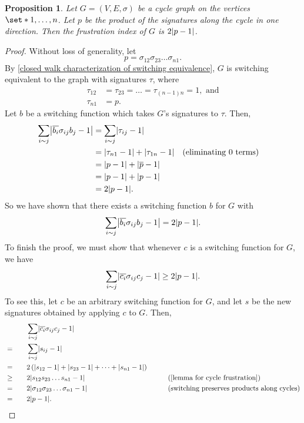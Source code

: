 \documentclass[12pt]{article}
\newtheorem{prop}[thm]{Proposition}
\theoremstyle{definition}
\DeclarePairedDelimiter\abs{\lvert}{\rvert}
\begin{document}
\begin{prop}\label{frustration of cycle graph}
Let $G = (V, E, \sigma)$ be a cycle graph on the vertices $\set*{1, \dots, n}$. Let $p$ be the product of the signatures along the cycle in one direction. Then the frustration index of $G$ is $2 \abs*{p - 1}$.
\end{prop}
\begin{proof}
Without loss of generality, let 
$$p=\sigma_{12}\sigma_{23} \dots \sigma_{n1}.$$
By \cref{closed walk characterization of switching equivalence}, $G$ is switching equivalent to the graph with signatures $\tau$, where 
\begin{align*}
\tau_{12} &= \tau_{23} = \dots = \tau_{(n-1)n} = 1, \text{ and} \\
\tau_{n1} &= p.
\end{align*}
Let $b$ be a switching function which takes $G$'s signatures to $\tau$. Then,
\begin{align*}
\sum_{i \sim j} \abs*{\overline{b_i} \sigma_{ij} b_j - 1} 
&= \sum_{i \sim j} \abs*{\tau_{ij} - 1} \\
&= \abs*{\tau_{n1} - 1} + \abs*{\tau_{1n} - 1} && \text{(eliminating 0 terms)} \\
&= \abs*{p - 1} + \abs*{\overline{p} - 1} \\
&= \abs*{p - 1} + \abs*{p - 1} \\
&= 2 \abs*{p - 1}.
\end{align*}
So we have shown that there exists a switching function $b$ for $G$ with 
$$
\sum_{i \sim j} \abs*{\overline{b_i} \sigma_{ij} b_j - 1} = 2 \abs*{p - 1}.
$$ 
To finish the proof, we must show that whenever $c$ is a switching function for $G$, we have
$$
\sum_{i \sim j} \abs*{\overline{c_i} \sigma_{ij} c_j - 1} \geq 2 \abs*{p - 1}.
$$
To see this, let $c$ be an arbitrary switching function for $G$, and let $s$ be the new signatures obtained by applying $c$ to $G$. Then,
\begin{alignat*}{3}
&& &\sum_{i \sim j} \abs*{\overline{c_i} \sigma_{ij} c_j - 1} && \\
&= & \quad &\sum_{i \sim j} \abs*{s_{ij} - 1} && \\
&= & &2 \left( \abs*{s_{12} - 1} + \abs*{s_{23} - 1} + \dots + \abs*{s_{n1} - 1} \right) && \\
&\geq & &2 \abs*{s_{12} s_{23} \dots s_{n1} - 1} & &\text{(\cref{lemma for cycle frustration})} \\
&= & &2 \abs*{\sigma_{12} \sigma_{23} \dots \sigma_{n1} - 1} &\quad\quad &\text{(switching preserves products along cycles)} \\
&= & &2 \abs*{p-1}. &&
\end{alignat*}
\end{proof}
\end{document}
